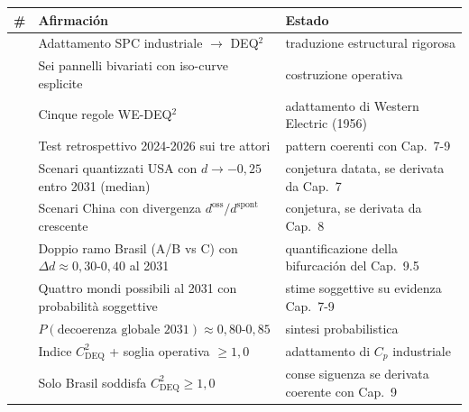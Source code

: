 {\def\LTcaptype{none} %
{\small\begin{longtable}[]{@{}
  >{\raggedright\arraybackslash}p{}
  >{\raggedright\arraybackslash}p{}
  >{\raggedright\arraybackslash}p{}@{}}
\toprule\noalign{}
\begin{minipage}[b]{\linewidth}\raggedright
\#
\end{minipage} & \begin{minipage}[b]{\linewidth}\raggedright
Afirmación
\end{minipage} & \begin{minipage}[b]{\linewidth}\raggedright
Estado
\end{minipage} \\
\midrule\noalign{}
\endhead
\bottomrule\noalign{}
\endlastfoot
1 & Adattamento SPC industriale $\to$ DEQ$^2$ & \Hypoth{} traduzione
estructural rigorosa \\
2 & Sei pannelli bivariati con iso-curve esplicite & \Hypoth{}
costruzione operativa \\
3 & Cinque regole WE-DEQ$^2$ & \Hypoth{} adattamento di Western Electric
(1956) \\
4 & Test retrospettivo 2024-2026 sui tre attori & \Proved{} pattern
coerenti con Cap.~7-9 \\
5 & Scenari quantizzati USA con \(d \to -0{,}25\) entro 2031 (median) &
\Conj{} conjetura datata, se derivata da Cap.~7 \\
6 & Scenari China con divergenza \(d^{\text{oss}}/d^{\text{spont}}\)
crescente & \Conj{} conjetura, se derivata da Cap.~8 \\
7 & Doppio ramo Brasil (A/B vs C) con
\(\Delta d \approx 0{,}30\)-\(0{,}40\) al 2031 & \Conj{} quantificazione
della bifurcación del Cap.~9.5 \\
8 & Quattro mondi possibili al 2031 con probabilità soggettive & \Conj{}
stime soggettive su evidenza Cap.~7-9 \\
9 & \(P(\text{decoerenza globale 2031}) \approx 0{,}80\)-\(0{,}85\) &
\Conj{} sintesi probabilistica \\
10 & Indice \(C_{\text{DEQ}}^2\) + soglia operativa \(\geq 1{,}0\) &
\Hypoth{} adattamento di \(C_p\) industriale \\
11 & Solo Brasil soddisfa \(C_{\text{DEQ}}^2 \geq 1{,}0\) & \Hypoth{}
conse siguenza se derivata coerente con Cap.~9 \\
\end{longtable}}
}


